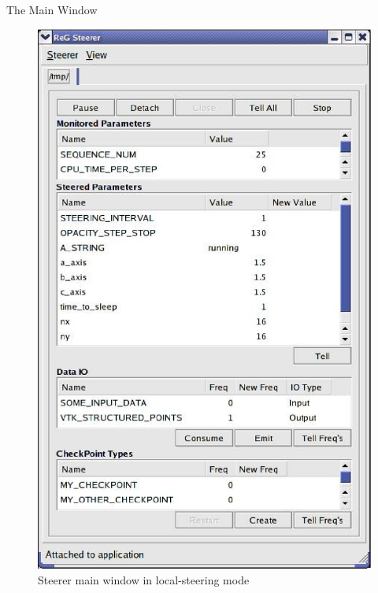 \documentclass[a4paper,twoside]{article}
\begin{document}

\begin{section}{The Main Window}

\begin{figure}
\centerline{\includegraphics{main_local.eps}}
\caption{Steerer main window in local-steering mode}
\label{fig:main_local}
\end{figure}


\end{section}
\end{document}
